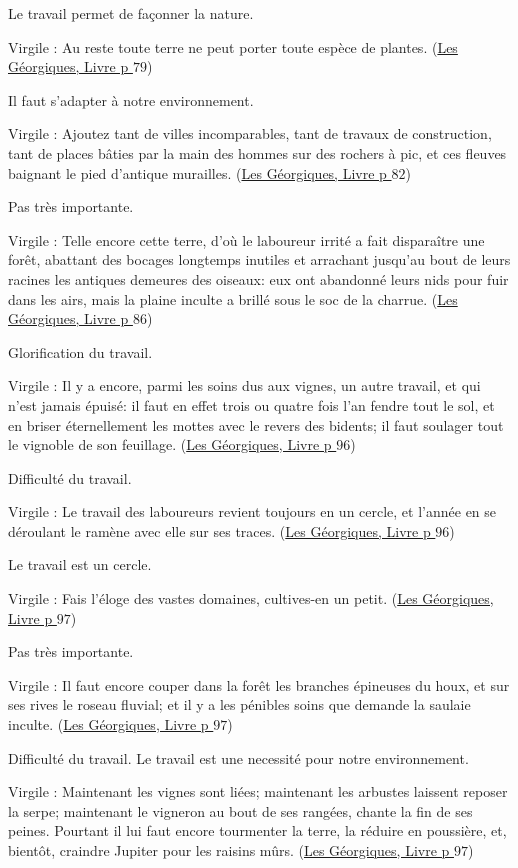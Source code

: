\documentclass[a4paper, 11pt, hidelinks]{article}
\newcommand{\bs}{\bigskip}
\newcommand{\rb}[1]{\Romanbar{#1}}
\newcommand{\citer}[3]{\bs \begin{center} \textcolor{authorGray}{#1 :} \textcolor{citationRed}{\og #2 \fg} \textcolor{authorGray}{(\underline{#3})} \end{center} \bs}
\begin{document}
Le travail permet de façonner la nature.


\citer{Virgile}{Au reste toute terre ne peut porter toute espèce de plantes.}{Les Géorgiques, Livre \rb{2} p $79$}


Il faut s'adapter à notre environnement.


\citer{Virgile}{Ajoutez tant de villes incomparables, tant de travaux de construction, tant de places bâties par la main des 
hommes sur des rochers à pic, et ces fleuves baignant le pied d'antique murailles.}{Les Géorgiques, Livre \rb{2} p $82$}


Pas très importante.


\citer{Virgile}{Telle encore cette terre, d'où le laboureur irrité a fait disparaître une forêt, abattant des bocages longtemps
inutiles et arrachant jusqu'au bout de leurs racines les antiques demeures des oiseaux: eux ont abandonné leurs nids pour fuir
dans les airs, mais la plaine inculte a brillé sous le soc de la charrue.}{Les Géorgiques, Livre \rb{2} p $86$}


Glorification du travail.


\citer{Virgile}{Il y a encore, parmi les soins dus aux vignes, un autre travail, et qui n'est jamais épuisé: il faut en effet
trois ou quatre fois l'an fendre tout le sol, et en briser éternellement les mottes avec le revers des bidents; il faut soulager
tout le vignoble de son feuillage.}{Les Géorgiques, Livre \rb{2} p $96$}


Difficulté du travail.


\citer{Virgile}{Le travail des laboureurs revient toujours en un cercle, et l'année en se déroulant le ramène avec elle sur ses 
traces.}{Les Géorgiques, Livre \rb{2} p $96$}


Le travail est un cercle.


\citer{Virgile}{Fais l'éloge des vastes domaines, cultives-en un petit.}{Les Géorgiques, Livre \rb{2} p $97$}


Pas très importante.


\citer{Virgile}{Il faut encore couper dans la forêt les branches épineuses du houx, et sur ses rives le roseau fluvial; et il y a les
pénibles soins que demande la saulaie inculte.}{Les Géorgiques, Livre \rb{2} p $97$}


Difficulté du travail. Le travail est une necessité pour notre environnement. 


\citer{Virgile}{Maintenant les vignes sont liées; maintenant les arbustes laissent reposer la serpe; maintenant le vigneron au bout de 
ses rangées, chante la fin de ses peines. Pourtant il lui faut encore tourmenter la terre, la réduire en poussière, et, bientôt,
craindre Jupiter pour les raisins mûrs.}{Les Géorgiques, Livre \rb{2} p $97$}
\end{document}
